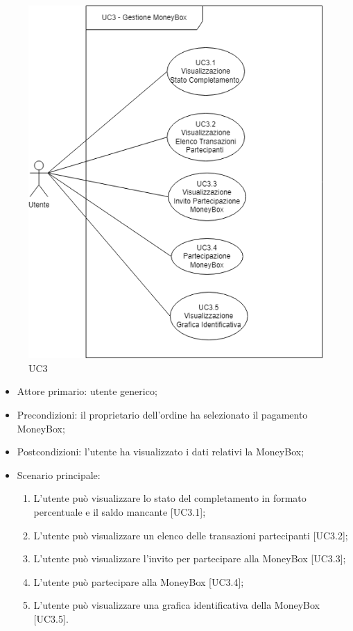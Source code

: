 \begin{figure}[H]
    \centering
    \includegraphics[scale=0.7]{immagini/UC3.png}
    \caption{UC3}
\end{figure}

\begin{itemize}
    \item Attore primario: utente generico;
    \item Precondizioni: il proprietario dell'ordine ha selezionato il pagamento MoneyBox\glo [UC2.2.2];
    \item Postcondizioni: l'utente ha visualizzato i dati relativi la MoneyBox\glo{};
    \item Scenario principale:
          \begin{enumerate}
                \item L'utente può visualizzare lo stato del completamento in formato percentuale e il saldo mancante [UC3.1];
                \item L'utente può visualizzare un elenco delle transazioni partecipanti [UC3.2];
                \item L'utente può visualizzare l'invito per partecipare alla MoneyBox\glo{} [UC3.3];
                \item L'utente può partecipare alla MoneyBox\glo{} [UC3.4];
                \item L'utente può visualizzare una grafica identificativa della MoneyBox\glo{} [UC3.5].
    \end{enumerate}
\end{itemize}

